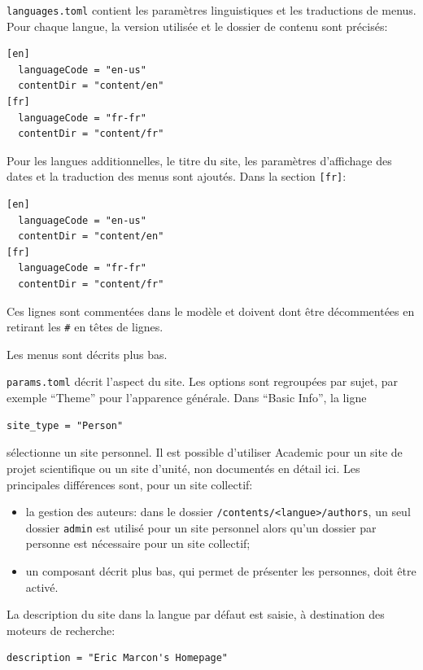 \documentclass[
  12pt,
  french,
  a4paper,
  extrafontsizes,onecolumn,openright
  ]{memoir}
\providecommand{\tightlist}{%
  \setlength{\itemsep}{0pt}\setlength{\parskip}{0pt}}
\begin{document}
\texttt{languages.toml} contient les paramètres linguistiques et les traductions de menus.
Pour chaque langue, la version utilisée et le dossier de contenu sont précisés:

\begin{verbatim}
[en]
  languageCode = "en-us"
  contentDir = "content/en"
[fr]
  languageCode = "fr-fr"
  contentDir = "content/fr"
\end{verbatim}

Pour les langues additionnelles, le titre du site, les paramètres d'affichage des dates et la traduction des menus sont ajoutés.
Dans la section \texttt{{[}fr{]}}:

\begin{verbatim}
[en]
  languageCode = "en-us"
  contentDir = "content/en"
[fr]
  languageCode = "fr-fr"
  contentDir = "content/fr"
\end{verbatim}

Ces lignes sont commentées dans le modèle et doivent dont être décommentées en retirant les \texttt{\#} en têtes de lignes.

Les menus sont décrits plus bas.

\texttt{params.toml} décrit l'aspect du site.
Les options sont regroupées par sujet, par exemple \enquote{Theme} pour l'apparence générale.
Dans \enquote{Basic Info}, la ligne

\begin{verbatim}
site_type = "Person"
\end{verbatim}

sélectionne un site personnel.
Il est possible d'utiliser Academic pour un site de projet scientifique ou un site d'unité, non documentés en détail ici.
Les principales différences sont, pour un site collectif:

\begin{itemize}
\tightlist
\item
  la gestion des auteurs: dans le dossier \texttt{/contents/\textless{}langue\textgreater{}/}\break\texttt{authors}, un seul dossier \texttt{admin} est utilisé pour un site personnel alors qu'un dossier par personne est nécessaire pour un site collectif;
\item
  un composant décrit plus bas, qui permet de présenter les personnes, doit être activé.
\end{itemize}

La description du site dans la langue par défaut est saisie, à destination des moteurs de recherche:

\begin{verbatim}
description = "Eric Marcon's Homepage"
\end{verbatim}
\end{document}

